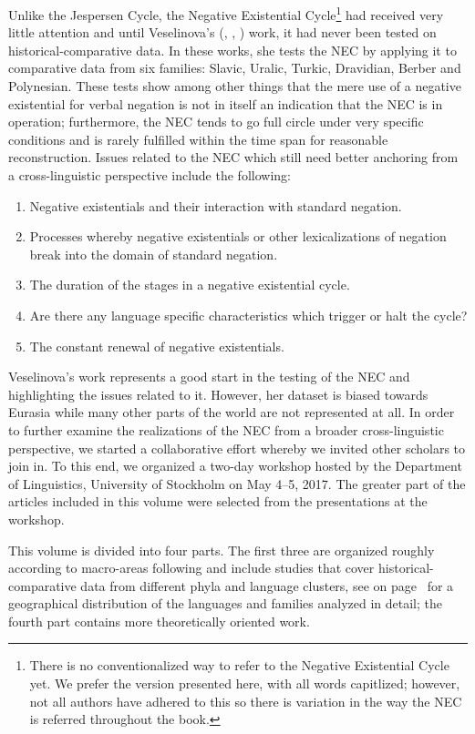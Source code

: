 \documentclass[output=paper,chinesefont,colorlinks,citecolor=brown]{langscibook}
\begin{document}
Unlike the Jespersen Cycle, the Negative Existential Cycle\footnote{There is no conventionalized way to refer to the Negative Existential Cycle yet. We prefer the version presented here, with all words capitlized; however, not all authors have adhered to this so there is variation in the way the NEC is referred throughout the book.} had received very little attention and until Veselinova’s (\citeyear{Veselinova2014}, \citeyear{Veselinova2016}, \citeyear{Veselinova2015}) work, it had never been tested on historical-comparative data. In these works, she tests the NEC by applying it to comparative data from six families: Slavic, Uralic, Turkic, Dravidian, Berber and Polynesian. These tests show among other things that the mere use of a negative existential for verbal negation is not in itself an indication that the NEC is in operation; furthermore, the NEC tends to go full circle under very specific conditions and is rarely fulfilled within the time span for reasonable reconstruction. Issues related to the NEC which still need better anchoring from a cross-linguistic perspective include the following:
\begin{enumerate}
    \item Negative existentials and their interaction with standard negation.
    \item Processes whereby negative existentials or other lexicalizations of negation break into the domain of standard negation.
    \item The duration of the stages in a negative existential cycle.
    \item Are there any language specific characteristics which trigger or halt the cycle?
    \item The constant renewal of negative existentials.
\end{enumerate}
Veselinova’s work represents a good start in the testing of the NEC and highlighting the issues related to it. However, her dataset is biased towards Eurasia while many other parts of the world are not represented at all. In order to further examine the realizations of the NEC from a broader cross-linguistic perspective, we started a collaborative effort whereby we invited other scholars to join in. To this end, we organized a two-day workshop hosted by the Department of Linguistics, University of Stockholm on May 4--5, 2017. The greater part of the articles included in this volume were selected from the presentations at the workshop.

This volume is divided into four parts. The first three are organized roughly according to macro-areas following \citet{dryerGreenbergianWordOrder1992} and include studies that cover historical-comparative data from different phyla and language clusters, see  on page~\pageref{fig:all-langs-in-book} for a geographical distribution of the languages and families analyzed in detail; the fourth part contains more theoretically oriented work.
\end{document}
